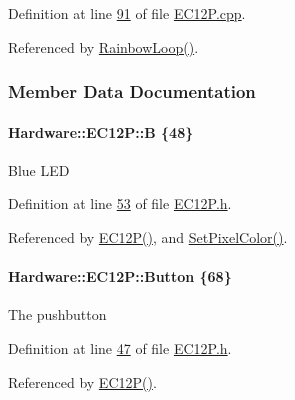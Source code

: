 Definition at line \hyperlink{_e_c12_p_8cpp_source_l00091}{91} of file \hyperlink{_e_c12_p_8cpp_source}{E\+C12\+P.\+cpp}.



Referenced by \hyperlink{_e_c12_p_8cpp_source_l00082}{Rainbow\+Loop()}.



\subsubsection{Member Data Documentation}
\hypertarget{class_hardware_1_1_e_c12_p_a326f00b2047ecb58ee1e7e894dc61ad3}{}
\paragraph[{B}]{ Hardware\+::\+E\+C12\+P\+::\+B \{48\}\hspace{0.3cm}{\ttfamily [private]}}\label{class_hardware_1_1_e_c12_p_a326f00b2047ecb58ee1e7e894dc61ad3}
Blue L\+E\+D 

Definition at line \hyperlink{_e_c12_p_8h_source_l00053}{53} of file \hyperlink{_e_c12_p_8h_source}{E\+C12\+P.\+h}.



Referenced by \hyperlink{_e_c12_p_8cpp_source_l00012}{E\+C12\+P()}, and \hyperlink{_e_c12_p_8cpp_source_l00035}{Set\+Pixel\+Color()}.

\hypertarget{class_hardware_1_1_e_c12_p_a6d91a7b1767f080af8c33bacdae1dd1d}{}
\paragraph[{Button}]{ Hardware\+::\+E\+C12\+P\+::\+Button \{68\}}\label{class_hardware_1_1_e_c12_p_a6d91a7b1767f080af8c33bacdae1dd1d}
The pushbutton 

Definition at line \hyperlink{_e_c12_p_8h_source_l00047}{47} of file \hyperlink{_e_c12_p_8h_source}{E\+C12\+P.\+h}.



Referenced by \hyperlink{_e_c12_p_8cpp_source_l00012}{E\+C12\+P()}.

\hypertarget{class_hardware_1_1_e_c12_p_a7afd63c14e12d861c8b20614ef34d70e}{}
